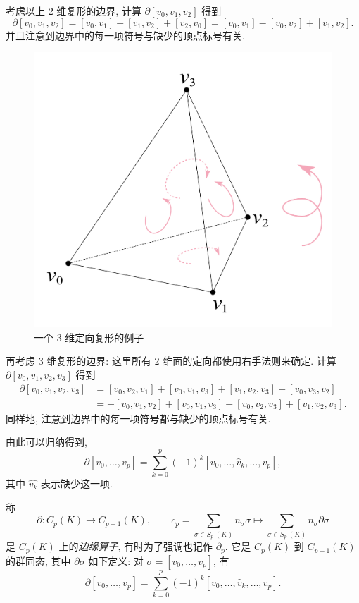 	考虑以上 2 维复形的边界, 计算 $ \partial[v_0,v_1,v_2] $ 得到
    \[
            \partial[v_0,v_1,v_2]=[v_0,v_1]+[v_1,v_2]+[v_2,v_0]=[v_0,v_1]-[v_0,v_2]+[v_1,v_2].
    \]
    并且注意到边界中的每一项符号与缺少的顶点标号有关.

	\begin{figure}[htbp]
		\centering
        \includegraphics[width=0.3\linewidth]{figures/Sec3-3.png}
        \caption{一个 3 维定向复形的例子}
	\end{figure}

	再考虑 3 维复形的边界: 这里所有 2 维面的定向都使用右手法则来确定. 计算 $ \partial[v_0,v_1,v_2,v_3] $ 得到
    \[
        \begin{aligned}
            \partial[v_0,v_1,v_2,v_3]& =[v_0,v_2,v_1]+[v_0,v_1,v_3]+[v_1,v_2,v_3]+[v_0,v_3,v_2]\\
            & =-[v_0,v_1,v_2]+[v_0,v_1,v_3]-[v_0,v_2,v_3]+[v_1,v_2,v_3].
        \end{aligned}
    \]
    同样地, 注意到边界中的每一项符号都与缺少的顶点标号有关.

	由此可以归纳得到,
    \[
        \partial[v_0,\dots,v_p]=\sum_{k=0}^p(-1)^k[v_0,\dots,\hat{v}_k,\dots,v_p],
    \]
    其中 $ \hat{v_k} $ 表示缺少这一项.

	\begin{Definition}[边缘算子]
        称
        \[
            \partial : C_p(K)\to C_{p-1}(K),\qquad c_p=\sum_{\sigma\in S_p^+(K)}n_\sigma\sigma\mapsto\sum_{\sigma\in S_p^+(K)}n_\sigma\partial\sigma
        \]
        是 $ C_p(K) $ 上的\emph{边缘算子}, 有时为了强调也记作 $ \partial_p $. 它是 $ C_p(K) $ 到 $ C_{p-1}(K) $ 的群同态, 其中 $ \partial\sigma $ 如下定义: 对 $ \sigma=[v_0,\dots,v_p] $, 有
        \[
            \partial[v_0,\dots,v_p]=\sum_{k=0}^p(-1)^k[v_0,\dots,\hat{v}_k,\dots,v_p].
        \]
    \end{Definition}

